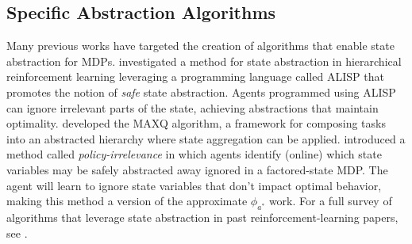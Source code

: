 
\subsection{Specific Abstraction Algorithms}
Many previous works have targeted the creation of algorithms that enable state abstraction for MDPs. \citeauthor*{andre2002state} investigated a method for state abstraction in hierarchical reinforcement learning leveraging a programming language called ALISP that promotes the notion of {\it safe} state abstraction. Agents programmed using ALISP can ignore irrelevant parts of the state, achieving abstractions that maintain optimality. \citeauthor{dietterich2000hierarchical} developed the MAXQ algorithm, a framework for composing tasks into an abstracted hierarchy where state aggregation can be applied. \citeauthor*{jong2005state} introduced a method called {\it policy-irrelevance} in which agents identify (online) which state variables may be safely abstracted away ignored in a factored-state \ac{MDP}. The agent will learn to ignore state variables that don't impact optimal behavior, making this method a version of the approximate $\phi_{a^*}$ work. For a full survey of algorithms that leverage state abstraction in past reinforcement-learning papers, see \citeauthor{li2006towards}.


